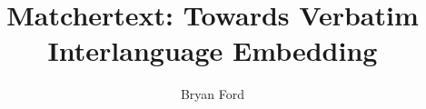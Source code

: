 \documentclass[fullpage,twocolumn]{article}
\begin{document}
\title{Matchertext: Towards Verbatim Interlanguage Embedding}

\author{Bryan Ford}

\maketitle













\arxiv{

}{

}
\end{document}
